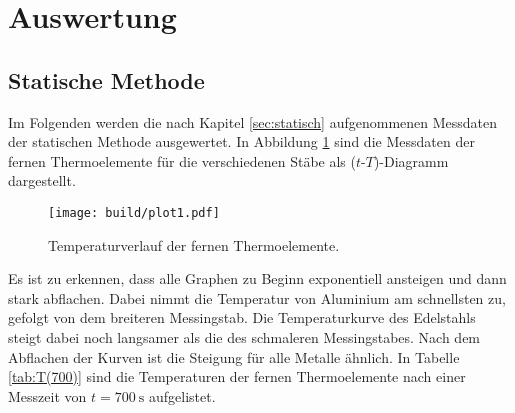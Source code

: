 \section{Auswertung}
\label{sec:auswertung}
\subsection{Statische Methode}
\label{sec:as}

Im Folgenden werden die nach Kapitel \ref{sec:statisch} aufgenommenen Messdaten der statischen Methode ausgewertet.
In Abbildung \ref{fig:temp} sind die Messdaten der fernen Thermoelemente für die verschiedenen Stäbe als ($t$-$T$)-Diagramm dargestellt.

\begin{figure}[H]
    \centering
    \texttt{[image: build/plot1.pdf]}
    \caption{Temperaturverlauf der fernen Thermoelemente.}
    \label{fig:temp}
\end{figure}

\noindent
Es ist zu erkennen, dass alle Graphen zu Beginn exponentiell ansteigen und dann stark abflachen. Dabei nimmt die Temperatur von Aluminium
am schnellsten zu, gefolgt von dem breiteren Messingstab. Die Temperaturkurve des Edelstahls steigt dabei noch langsamer als
die des schmaleren Messingstabes. Nach dem Abflachen der Kurven ist die Steigung für alle Metalle ähnlich. In Tabelle \ref{tab:T(700)}
sind die Temperaturen der fernen Thermoelemente nach einer Messzeit von $t=\SI[]{700}[]{\second}$ aufgelistet.

